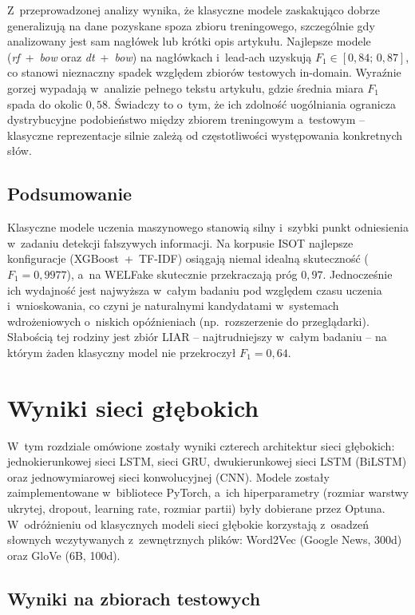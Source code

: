 Z~przeprowadzonej analizy wynika, że klasyczne modele zaskakująco dobrze
generalizują na dane pozyskane spoza zbioru treningowego, szczególnie
gdy analizowany jest sam nagłówek lub krótki opis artykułu. Najlepsze
modele (\textit{rf}~+~\textit{bow} oraz \textit{dt}~+~\textit{bow}) na
nagłówkach i~lead-ach uzyskują \(F_1 \in [0{,}84;\,0{,}87]\), co
stanowi nieznaczny spadek względem zbiorów testowych in-domain.
Wyraźnie gorzej wypadają w~analizie pełnego tekstu artykułu, gdzie
średnia miara $F_1$ spada do okolic \(0{,}58\). Świadczy to o~tym,
że ich zdolność uogólniania ogranicza dystrybucyjne podobieństwo
między zbiorem treningowym a~testowym -- klasyczne reprezentacje
silnie zależą od częstotliwości występowania konkretnych słów.

\subsection{Podsumowanie}
\label{sec:wyniki_klasyczne_podsum}

Klasyczne modele uczenia maszynowego stanowią silny i~szybki punkt
odniesienia w~zadaniu detekcji fałszywych informacji. Na korpusie ISOT
najlepsze konfiguracje (XGBoost~+~TF-IDF) osiągają niemal idealną
skuteczność (\(F_1 = 0{,}9977\)), a~na WELFake skutecznie przekraczają
próg \(0{,}97\). Jednocześnie ich wydajność jest najwyższa w~całym
badaniu pod względem czasu uczenia i~wnioskowania, co czyni je
naturalnymi kandydatami w~systemach wdrożeniowych o~niskich opóźnieniach
(np.\ rozszerzenie do przeglądarki). Słabością tej rodziny jest zbiór
LIAR -- najtrudniejszy w~całym badaniu -- na którym żaden klasyczny
model nie przekroczył \(F_1 = 0{,}64\).

\section{Wyniki sieci głębokich}
\label{sec:wyniki_glebokie}

W~tym rozdziale omówione zostały wyniki czterech architektur sieci
głębokich: jednokierunkowej sieci LSTM, sieci GRU, dwukierunkowej
sieci LSTM (BiLSTM) oraz jednowymiarowej sieci konwolucyjnej (CNN).
Modele zostały zaimplementowane w~bibliotece PyTorch, a~ich
hiperparametry (rozmiar warstwy ukrytej, dropout, learning rate,
rozmiar partii) były dobierane przez Optuna. W~odróżnieniu od
klasycznych modeli sieci głębokie korzystają z~osadzeń słownych
wczytywanych z~zewnętrznych plików: Word2Vec (Google News, 300d)
oraz GloVe (6B, 100d).

\subsection{Wyniki na zbiorach testowych}
\label{sec:wyniki_glebokie_test}

